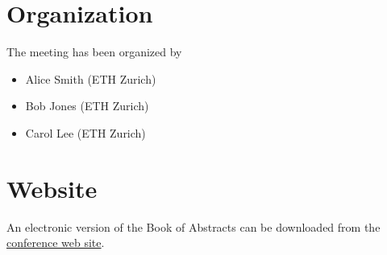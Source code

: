 \section*{Organization}
The meeting has been organized by
\begin{itemize}
  \item Alice Smith (ETH Zurich)
  \item Bob Jones (ETH Zurich)
  \item Carol Lee (ETH Zurich)
\end{itemize}

\section*{Website}
An electronic version of the Book of Abstracts can be downloaded from the
\href{https://www.example-conference.org}{conference web site}.
